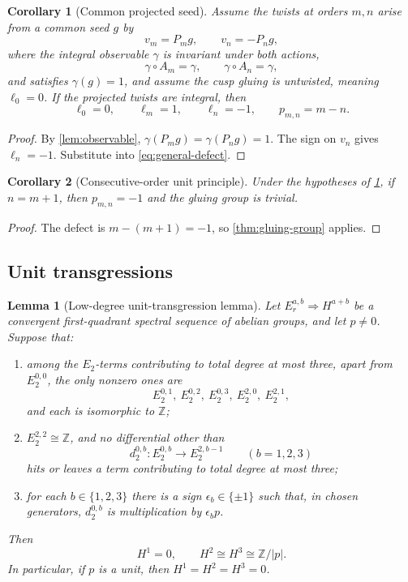 \documentclass[11pt,reqno]{amsart}
\numberwithin{equation}{section}
\newcommand{\Z}{\mathbb Z}
\newtheorem{lemma}[lemma]{Lemma}
\newtheorem{corollary}[corollary]{Corollary}
\theoremstyle{definition}
\begin{document}
\begin{corollary}[Common projected seed]\label{cor:projected-defect}
Assume the twists at orders $m,n$ arise from a common seed $g$ by
\[
v_m=P_mg,
\qquad
v_n=-P_ng,
\]
where the integral observable $\gamma$ is invariant under both actions,
\[
\gamma\circ A_m=\gamma,
\qquad
\gamma\circ A_n=\gamma,
\]
and satisfies $\gamma(g)=1$, and assume the cusp gluing is untwisted, meaning $\ell_0=0$. If the projected twists are integral, then
\[
\ell_0=0,
\qquad
\ell_m=1,
\qquad
\ell_n=-1,
\qquad
p_{m,n}=m-n.
\]
\end{corollary}

\begin{proof}
By \cref{lem:observable}, $\gamma(P_mg)=\gamma(P_ng)=1$. The sign on $v_n$ gives $\ell_n=-1$. Substitute into \cref{eq:general-defect}.
\end{proof}

\begin{corollary}[Consecutive-order unit principle]\label{cor:consecutive}
Under the hypotheses of \cref{cor:projected-defect}, if $n=m+1$, then $p_{m,n}=-1$ and the gluing group is trivial.
\end{corollary}

\begin{proof}
The defect is $m-(m+1)=-1$, so \cref{thm:gluing-group} applies.
\end{proof}

\subsection{Unit transgressions}

\begin{lemma}[Low-degree unit-transgression lemma]\label{lem:unit-transgression}
Let $E_r^{a,b}\Rightarrow H^{a+b}$ be a convergent first-quadrant spectral sequence of abelian groups, and let $p\ne0$. Suppose that:
\begin{enumerate}
\item among the $E_2$-terms contributing to total degree at most three, apart from $E_2^{0,0}$, the only nonzero ones are
\[
E_2^{0,1},\ E_2^{0,2},\ E_2^{0,3},\ E_2^{2,0},\ E_2^{2,1},
\]
and each is isomorphic to $\Z$;
\item $E_2^{2,2}\cong\Z$, and no differential other than
\[
d_2^{0,b}:E_2^{0,b}\longrightarrow E_2^{2,b-1}
\qquad(b=1,2,3)
\]
hits or leaves a term contributing to total degree at most three;
\item for each $b\in\{1,2,3\}$ there is a sign $\epsilon_b\in\{\pm1\}$ such that, in chosen generators, $d_2^{0,b}$ is multiplication by $\epsilon_b p$.
\end{enumerate}
Then
\[
H^1=0,
\qquad
H^2\cong H^3\cong\Z/|p|.
\]
In particular, if $p$ is a unit, then $H^1=H^2=H^3=0$.
\end{lemma}
\end{document}
